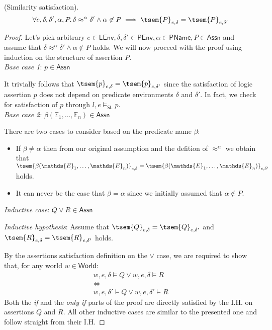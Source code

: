 \begin{lem}
	\label{lem:simSat}
	(Similarity satisfaction).
	\[
		\forall e, \delta, \delta', \alpha, P \ldotp \delta \approx^\alpha \delta' \land \alpha \not\in P \implies \tsem{P}_{e, \delta} = \tsem{P}_{e, \delta'}
	\]
	{\parindent0pt
	\begin{proof}
		Let's pick arbitrary $e \in \mathsf{LEnv}, \delta, \delta' \in \mathsf{PEnv}, \alpha \in \mathsf{PName}, P \in \mathsf{Assn}$ and assume that $\delta \approx^\alpha \delta' \land \alpha \not\in P$ holds. We will now proceed with the proof using induction on the structure of assertion $P$. \\
		
		\textit{Base case 1}: $p \in \mathsf{Assn}$
		
		It trivially follows that $\tsem{p}_{e, \delta} = \tsem{p}_{e, \delta'}$ since the satisfaction of logic assertion $p$ does not depend on predicate environments $\delta$ and $\delta'$. In fact, we check for satisfaction of $p$ through $l, e \vDash_\mathsf{SL} p$. \\
		
		\textit{Base case 2}: $\beta(\mathds{E}_1, \ldots, \mathds{E}_n) \in \mathsf{Assn}$
		
		There are two cases to consider based on the predicate name $\beta$:
		\begin{itemize}
			\item If $\beta \neq \alpha$ then from our original assumption and the defition of $\approx^\alpha$ we obtain that $\tsem{\beta(\mathds{E}_1, \ldots, \mathds{E}_n)}_{e, \delta} = \tsem{\beta(\mathds{E}_1, \ldots, \mathds{E}_n)}_{e, \delta'}$ holds.
			
			\item It can never be the case that $\beta = \alpha$ since we initially assumed that $\alpha \not\in P$.
		\end{itemize}
		
		\textit{Inductive case}: $Q \lor R \in \mathsf{Assn}$
		
		\textit{Inductive hypothesis}: Assume that $\tsem{Q}_{e, \delta} = \tsem{Q}_{e, \delta'}$ and $\tsem{R}_{e, \delta} = \tsem{R}_{e, \delta'}$ holds.
		
		By the assertions satisfaction definition on the $\lor$ case, we are required to show that, for any world $w \in \mathsf{World}$:
		\begin{gather}
			w, e, \delta \vDash Q \lor w, e, \delta \vDash R \\
			\iff \\
			w, e, \delta' \vDash Q \lor w, e, \delta' \vDash R
		\end{gather}
		Both the \textit{if} and the \textit{only if} parts of the proof are directly satisfied by the I.H. on assertions $Q$ and $R$. All other inductive cases are similar to the presented one and follow straight from their I.H.
	\end{proof}
	}
\end{lem}

